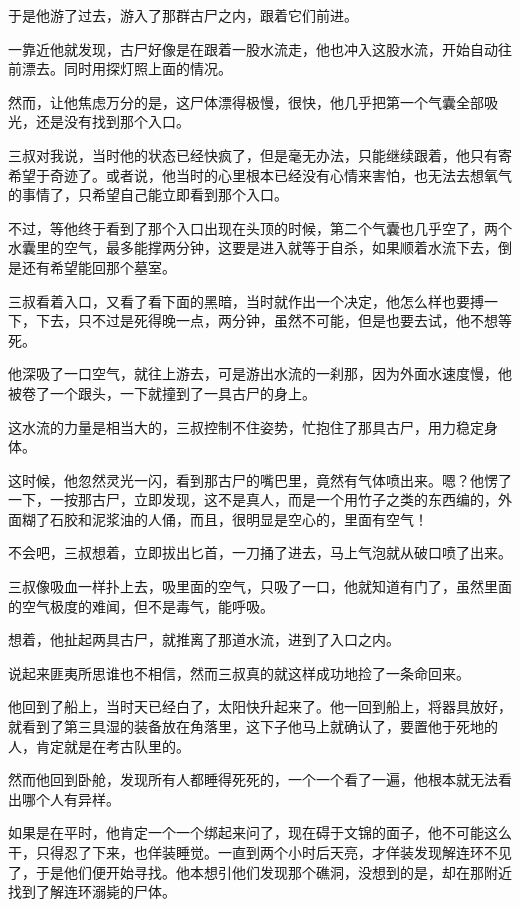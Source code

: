 于是他游了过去，游入了那群古尸之内，跟着它们前进。

一靠近他就发现，古尸好像是在跟着一股水流走，他也冲入这股水流，开始自动往前漂去。同时用探灯照上面的情况。

然而，让他焦虑万分的是，这尸体漂得极慢，很快，他几乎把第一个气囊全部吸光，还是没有找到那个入口。

三叔对我说，当时他的状态已经快疯了，但是毫无办法，只能继续跟着，他只有寄希望于奇迹了。或者说，他当时的心里根本已经没有心情来害怕，也无法去想氧气的事情了，只希望自己能立即看到那个入口。

不过，等他终于看到了那个入口出现在头顶的时候，第二个气囊也几乎空了，两个水囊里的空气，最多能撑两分钟，这要是进入就等于自杀，如果顺着水流下去，倒是还有希望能回那个墓室。

三叔看着入口，又看了看下面的黑暗，当时就作出一个决定，他怎么样也要搏一下，下去，只不过是死得晚一点，两分钟，虽然不可能，但是也要去试，他不想等死。

他深吸了一口空气，就往上游去，可是游出水流的一刹那，因为外面水速度慢，他被卷了一个跟头，一下就撞到了一具古尸的身上。

这水流的力量是相当大的，三叔控制不住姿势，忙抱住了那具古尸，用力稳定身体。

这时候，他忽然灵光一闪，看到那古尸的嘴巴里，竟然有气体喷出来。嗯？他愣了一下，一按那古尸，立即发现，这不是真人，而是一个用竹子之类的东西编的，外面糊了石胶和泥浆油的人俑，而且，很明显是空心的，里面有空气！

不会吧，三叔想着，立即拔出匕首，一刀捅了进去，马上气泡就从破口喷了出来。

三叔像吸血一样扑上去，吸里面的空气，只吸了一口，他就知道有门了，虽然里面的空气极度的难闻，但不是毒气，能呼吸。

想着，他扯起两具古尸，就推离了那道水流，进到了入口之内。

说起来匪夷所思谁也不相信，然而三叔真的就这样成功地捡了一条命回来。

他回到了船上，当时天已经白了，太阳快升起来了。他一回到船上，将器具放好，就看到了第三具湿的装备放在角落里，这下子他马上就确认了，要置他于死地的人，肯定就是在考古队里的。

然而他回到卧舱，发现所有人都睡得死死的，一个一个看了一遍，他根本就无法看出哪个人有异样。

如果是在平时，他肯定一个一个绑起来问了，现在碍于文锦的面子，他不可能这么干，只得忍了下来，也佯装睡觉。一直到两个小时后天亮，才佯装发现解连环不见了，于是他们便开始寻找。他本想引他们发现那个礁洞，没想到的是，却在那附近找到了解连环溺毙的尸体。

